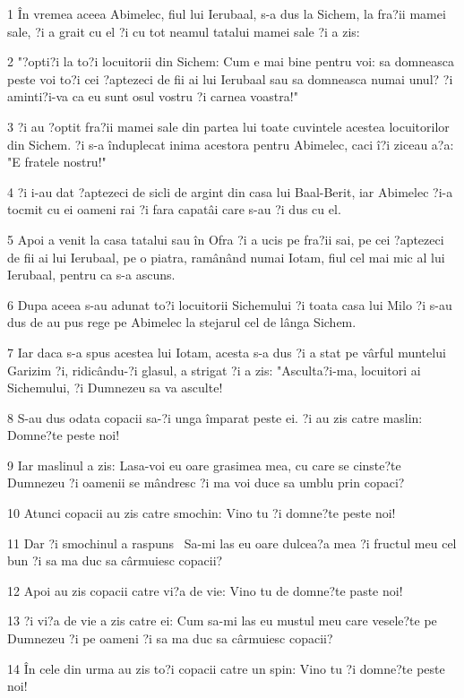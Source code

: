 \par 1 În vremea aceea Abimelec, fiul lui Ierubaal, s-a dus la Sichem, la fra?ii mamei sale, ?i a grait cu el ?i cu tot neamul tatalui mamei sale ?i a zis:
\par 2 "?opti?i la to?i locuitorii din Sichem: Cum e mai bine pentru voi: sa domneasca peste voi to?i cei ?aptezeci de fii ai lui Ierubaal sau sa domneasca numai unul? ?i aminti?i-va ca eu sunt osul vostru ?i carnea voastra!"
\par 3 ?i au ?optit fra?ii mamei sale din partea lui toate cuvintele acestea locuitorilor din Sichem. ?i s-a înduplecat inima acestora pentru Abimelec, caci î?i ziceau a?a: "E fratele nostru!"
\par 4 ?i i-au dat ?aptezeci de sicli de argint din casa lui Baal-Berit, iar Abimelec ?i-a tocmit cu ei oameni rai ?i fara capatâi care s-au ?i dus cu el.
\par 5 Apoi a venit la casa tatalui sau în Ofra ?i a ucis pe fra?ii sai, pe cei ?aptezeci de fii ai lui Ierubaal, pe o piatra, ramânând numai Iotam, fiul cel mai mic al lui Ierubaal, pentru ca s-a ascuns.
\par 6 Dupa aceea s-au adunat to?i locuitorii Sichemului ?i toata casa lui Milo ?i s-au dus de au pus rege pe Abimelec la stejarul cel de lânga Sichem.
\par 7 Iar daca s-a spus acestea lui Iotam, acesta s-a dus ?i a stat pe vârful muntelui Garizim ?i, ridicându-?i glasul, a strigat ?i a zis: "Asculta?i-ma, locuitori ai Sichemului, ?i Dumnezeu sa va asculte!
\par 8 S-au dus odata copacii sa-?i unga împarat peste ei. ?i au zis catre maslin: Domne?te peste noi!
\par 9 Iar maslinul a zis: Lasa-voi eu oare grasimea mea, cu care se cinste?te Dumnezeu ?i oamenii se mândresc ?i ma voi duce sa umblu prin copaci?
\par 10 Atunci copacii au zis catre smochin: Vino tu ?i domne?te peste noi!
\par 11 Dar ?i smochinul a raspuns  Sa-mi las eu oare dulcea?a mea ?i fructul meu cel bun ?i sa ma duc sa cârmuiesc copacii?
\par 12 Apoi au zis copacii catre vi?a de vie: Vino tu de domne?te paste noi!
\par 13 ?i vi?a de vie a zis catre ei: Cum sa-mi las eu mustul meu care vesele?te pe Dumnezeu ?i pe oameni ?i sa ma duc sa cârmuiesc copacii?
\par 14 În cele din urma au zis to?i copacii catre un spin: Vino tu ?i domne?te peste noi!
